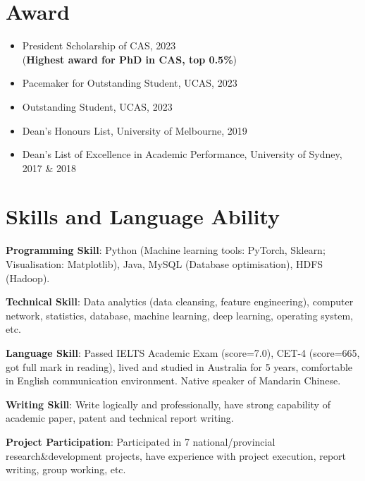 \documentclass[letterpaper,10.9pt]{article}
\begin{document}

\section{\textbf{Award}}
\vspace{-5mm}
\begin{multicols}{2}
\begin{itemize}
  \setlength\itemsep{2.0pt}
  \item President Scholarship of CAS, 2023\\(\textbf{Highest award for PhD in CAS, top 0.5\%})
  \item Pacemaker for Outstanding Student, UCAS, 2023
  \item Outstanding Student, UCAS, 2023
  \item Dean's Honours List, University of Melbourne, 2019
  \item Dean's List of Excellence in Academic Performance, University of Sydney, 2017 \& 2018
\end{itemize}
\end{multicols}




\section{\textbf{Skills and Language Ability}}
\textbf{Programming Skill}: Python (Machine learning tools: PyTorch, Sklearn; Visualisation: Matplotlib), Java, MySQL (Database optimisation), HDFS (Hadoop). 

\vspace{2mm}

\textbf{Technical Skill}: Data analytics (data cleansing, feature engineering), computer network, statistics, database, machine learning, deep learning, operating system, etc. 

\vspace{2mm}

\textbf{Language Skill}: Passed IELTS Academic Exam (score=7.0), CET-4 (score=665, got full mark in reading), lived and studied in Australia for 5 years, comfortable in English communication environment. Native speaker of Mandarin Chinese. 

\vspace{2mm}

\textbf{Writing Skill}: Write logically and professionally, have strong capability of academic paper, patent and technical report writing. 

\vspace{2mm}

\textbf{Project Participation}: Participated in 7 national/provincial research\&development projects, have experience with project execution, report writing, group working, etc. 
\end{document}
